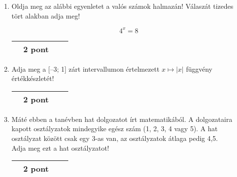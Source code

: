 \documentclass[12pt,a4paper]{article}
\begin{document}
\begin{enumerate}[leftmargin=*,label=\textbf{\large\arabic*.}]
\newpage

    \item
Oldja meg az alábbi egyenletet a valós számok halmazán!
Válaszát tizedes tört alakban adja meg! 

\[4^x=8\]


    \vspace{4cm}
    \begin{flushright}
        \begin{tabular}{|M{6cm}|M{2cm}|M{2cm}|N}
        \hline
         & 
        \vspace{20pt}
         2 pont  &  \\[30pt]
        \hline
        \end{tabular}
    \end{flushright}
    
    \item

Adja meg a [–3; 1] zárt intervallumon értelmezett \(x \mapsto |x|\) függvény értékkészletét!


    \vspace{\fill}
    \begin{flushright}
        \begin{tabular}{|M{6cm}|M{2cm}|M{2cm}|N}
        \hline
         & 
        \vspace{20pt}
         2 pont  &  \\[30pt]
        \hline
        \end{tabular}
    \end{flushright}

\newpage

\item
Máté ebben a tanévben hat dolgozatot írt matematikából. A dolgozataira kapott osztályzatok mindegyike egész szám (1, 2, 3, 4 vagy 5). A hat osztályzat között csak egy 3-as
van, az osztályzatok átlaga pedig 4,5.\\
Adja meg ezt a hat osztályzatot! 


    \vspace{4cm}
    \begin{flushright}
        \begin{tabular}{|M{6cm}|M{2cm}|M{2cm}|N}
        \hline
         & 
        \vspace{20pt}
         2 pont  &  \\[30pt]
        \hline
        \end{tabular}
    \end{flushright}


\end{enumerate}
\end{document}
